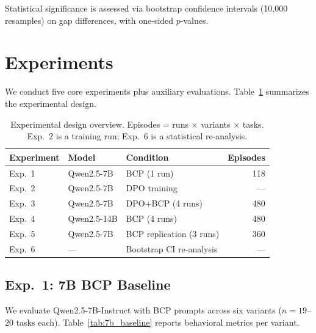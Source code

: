 \documentclass[11pt,a4paper]{article}
\newcommand{\bcp}{\textsc{BCP}}
\begin{document}
Statistical significance is assessed via bootstrap confidence intervals (10,000 resamples) on gap differences, with one-sided $p$-values.

\section{Experiments}
\label{sec:experiments}

We conduct five core experiments plus auxiliary evaluations.
Table~\ref{tab:experiment_overview} summarizes the experimental design.

\begin{table}[t]
\centering
\small
\begin{tabular}{@{}lllr@{}}
\toprule
\textbf{Experiment} & \textbf{Model} & \textbf{Condition} & \textbf{Episodes} \\
\midrule
Exp.~1 & Qwen2.5-7B & \bcp{} (1 run) & 118 \\
Exp.~2 & Qwen2.5-7B & DPO training & --- \\
Exp.~3 & Qwen2.5-7B & DPO+\bcp{} (4 runs) & 480 \\
Exp.~4 & Qwen2.5-14B & \bcp{} (4 runs) & 480 \\
Exp.~5 & Qwen2.5-7B & \bcp{} replication (3 runs) & 360 \\
Exp.~6 & --- & Bootstrap CI re-analysis & --- \\
\bottomrule
\end{tabular}
\caption{Experimental design overview. Episodes = runs $\times$ variants $\times$ tasks. Exp.~2 is a training run; Exp.~6 is a statistical re-analysis.}
\label{tab:experiment_overview}
\end{table}

\subsection{Exp.~1: 7B \bcp{} Baseline}
\label{sec:exp1}

We evaluate Qwen2.5-7B-Instruct with \bcp{} prompts across six variants ($n = 19$--$20$ tasks each).
Table~\ref{tab:7b_baseline} reports behavioral metrics per variant.
\end{document}
